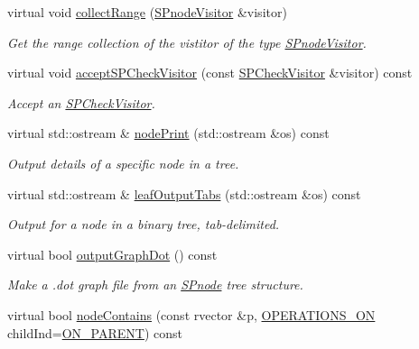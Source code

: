 \begin{DoxyCompactItemize}
virtual void \hyperlink{classsubpavings_1_1SPnode_a2cedd2483f8546bb24e8990f7312f591}{collect\-Range} (\hyperlink{classsubpavings_1_1SPnodeVisitor}{\-S\-Pnode\-Visitor} \&visitor)
\begin{DoxyCompactList}\small\item\em \-Get the range collection of the vistitor of the type \hyperlink{classsubpavings_1_1SPnodeVisitor}{\-S\-Pnode\-Visitor}. \end{DoxyCompactList}\item 
virtual void \hyperlink{classsubpavings_1_1SPnode_a53cc083de0b60fc7e8b163cffd7428fe}{accept\-S\-P\-Check\-Visitor} (const \hyperlink{classsubpavings_1_1SPCheckVisitor}{\-S\-P\-Check\-Visitor} \&visitor) const 
\begin{DoxyCompactList}\small\item\em \-Accept an \hyperlink{classsubpavings_1_1SPCheckVisitor}{\-S\-P\-Check\-Visitor}. \end{DoxyCompactList}\item 
virtual std\-::ostream \& \hyperlink{classsubpavings_1_1SPnode_aaf14185437d50e955c5ea938dc6e7559}{node\-Print} (std\-::ostream \&os) const 
\begin{DoxyCompactList}\small\item\em \-Output details of a specific node in a tree. \end{DoxyCompactList}\item 
virtual std\-::ostream \& \hyperlink{classsubpavings_1_1SPnode_a0f2381175b37224a185eedbe9601d814}{leaf\-Output\-Tabs} (std\-::ostream \&os) const 
\begin{DoxyCompactList}\small\item\em \-Output for a node in a binary tree, tab-\/delimited. \end{DoxyCompactList}\item 
virtual bool \hyperlink{classsubpavings_1_1SPnode_aaaf0891a67e056e19f8e086c0139fd96}{output\-Graph\-Dot} () const 
\begin{DoxyCompactList}\small\item\em \-Make a .dot graph file from an \hyperlink{classsubpavings_1_1SPnode}{\-S\-Pnode} tree structure. \end{DoxyCompactList}\item 
virtual bool \hyperlink{classsubpavings_1_1SPnode_aaefe6100d8c62dc84849cd2adb733ffb}{node\-Contains} (const rvector \&p, \hyperlink{namespacesubpavings_ae1ea349cda4812634df03761ebfc1c98}{\-O\-P\-E\-R\-A\-T\-I\-O\-N\-S\-\_\-\-O\-N} child\-Ind=\hyperlink{namespacesubpavings_ae1ea349cda4812634df03761ebfc1c98a4863db89a4712e90bb113f9acf898781}{\-O\-N\-\_\-\-P\-A\-R\-E\-N\-T}) const 

\end{DoxyCompactItemize}
